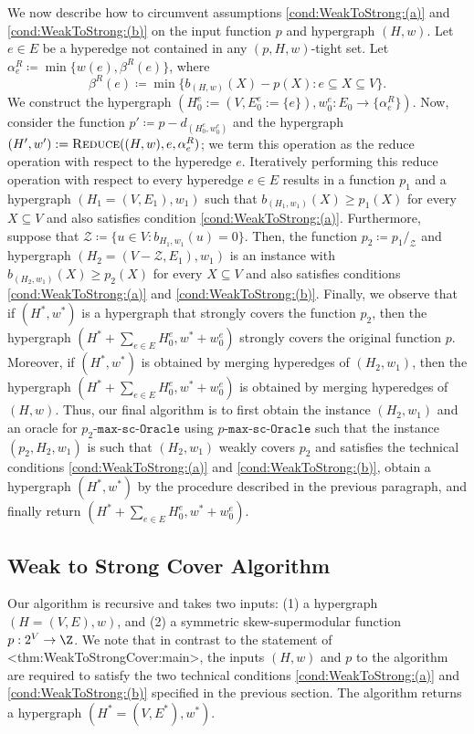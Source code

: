 \documentclass{article}
\def\Cref#1{<#1>}%
\newcommand{\zeros}{\ensuremath{\mathcal{Z}}\xspace}
\newcommand{\functionMaximizationOracleStrongCover}[1]{\ensuremath{{#1}\text{-}\mathtt{max}\text{-}\mathtt{sc}\text{-}\mathtt{Oracle}}\xspace}
\newcommand{\shubhang}[1]{{\color{blue}[{\tiny Shubhang: \bf #1}]\marginpar{\color{blue}*}}}
\newcommand{\kristof}[1]{{\color{purple}[{\tiny Kristof: \bf #1}]\marginpar{\color{red}*}}}
\newcommand{\functionContract}[2]{\ensuremath{{#1}/_{#2}}\xspace}
\newcommand{\reduce}{\ensuremath{\textsc{Reduce}}\xspace}
\begin{document}
We now describe how to circumvent assumptions \ref{cond:WeakToStrong:(a)} and \ref{cond:WeakToStrong:(b)} on the input function $p$ and hypergraph $(H,w)$. Let $e \in E$ be a hyperedge not contained in any $(p, H, w)$-tight set. Let $\alpha_e^R \coloneqq  \min\{w(e), \beta^R(e)\}$, where $$\beta^R(e) \coloneqq  \min\{b_{(H,w)}(X) - p(X) : e \subseteq X \subseteq V\}.$$
We construct the hypergraph $(H_0^e:=(V, E_0^e:=\{e\}), w_0^e:E_0\rightarrow \{\alpha^R_e\})$. Now, consider the function $p' \coloneqq  p - d_{(H_0^e, w_0^e)}$ and the  hypergraph $(H', w'):=\reduce((H, w), e, \alpha^R_e)$; we term this operation as the reduce operation with respect to the hyperedge $e$. 
Iteratively performing this reduce operation with respect to every hyperedge $e \in E$ results in a function $p_1$ and a hypergraph $(H_1 = (V, E_1), w_1)$ such that $b_{(H_1, w_1)}(X)\ge p_1(X)$ for every $X\subseteq V$ and also satisfies condition \ref{cond:WeakToStrong:(a)}. Furthermore, suppose that $\zeros \coloneqq  \{u \in V : b_{H_1, w_1}(u) = 0\}$. Then, the function $p_2 \coloneqq  \functionContract{p_1}{\zeros}$ and hypergraph $(H_2 = (V - \zeros, E_1), w_1)$ is an instance with $b_{(H_2, w_1)}(X)\ge p_2(X)$ for every $X\subseteq V$ and also satisfies conditions \ref{cond:WeakToStrong:(a)} and \ref{cond:WeakToStrong:(b)}. Finally, we observe that if $(H^*, w^*)$ is a hypergraph that strongly covers the function $p_2$, then the hypergraph $(H^*+\sum_{e \in E}H_0^e, w^*+w_0^e)$ strongly covers the original function $p$. Moreover,  if $(H^*, w^*)$ is obtained by merging hyperedges of $(H_2, w_1)$, then the  hypergraph $(H^*+\sum_{e \in E}H_0^e, w^*+w_0^e)$ is obtained by merging hyperedges of $(H, w)$. Thus, our final algorithm is to first obtain the instance $(H_2, w_1)$ and an oracle for \functionMaximizationOracleStrongCover{p_2} using \functionMaximizationOracleStrongCover{p} such that the instance $(p_2, H_2, w_1)$ is such that $(H_2, w_1)$ weakly covers $p_2$ and satisfies the technical conditions \ref{cond:WeakToStrong:(a)} and \ref{cond:WeakToStrong:(b)}, obtain a hypergraph $(H^*, w^*)$ by the procedure described in the previous paragraph, and finally return $(H^*+\sum_{e \in E}H_0^e, w^*+w_0^e)$. 

\subsection{Weak to Strong Cover Algorithm}\label{sec:WeakToStrongCover:Algorithm}
Our algorithm is recursive and takes two inputs: (1) a hypergraph $(H = (V, E), w)$, and (2) a symmetric skew-supermodular function $p:2^V \rightarrow\Z$. We note that in contrast to the statement of \Cref{thm:WeakToStrongCover:main}, the inputs $(H,w)$ and $p$ to the algorithm are required to satisfy the two technical conditions 
\ref{cond:WeakToStrong:(a)} and \ref{cond:WeakToStrong:(b)} specified in the previous section. The algorithm returns a hypergraph $\left(H^*= \left(V, E^*\right), w^*\right)$. 
\end{document}
